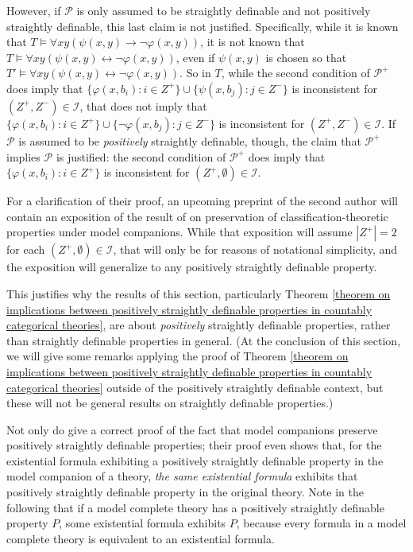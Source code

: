 \documentclass{article}
\newcommand{\vphi}{\varphi}
\theoremstyle{definition}
\theoremstyle{definition}
\theoremstyle{definition}
\begin{document}
{    However, if $\mathcal{P}$ is only assumed to be straightly definable and not positively straightly definable, this last claim is not justified. Specifically, while it is known that $T \models \forall x  y(\psi(x, y) \to \neg\varphi(x, y))$, it is not known that $T \models \forall x y(\psi(x, y) \leftrightarrow \neg\varphi(x, y))$, even if $\psi(x, y)$ is chosen so that $T' \models \forall x y(\psi(x, y) \leftrightarrow \neg\varphi(x, y))$. So in $T$, while the second condition of $\mathcal{P}^{+}$ does imply that $\{\vphi(x,b_i)\colon i\in Z^+\}\cup \{\psi(x,b_j)\colon j\in Z^-\}$ is inconsistent for $(Z^{+}, Z^{-}) \in \mathcal{I}$, that does not imply that $\{\vphi(x,b_i)\colon i\in Z^+\}\cup \{\neg\vphi(x,b_j)\colon j\in Z^-\}$ is inconsistent for $(Z^{+}, Z^{-}) \in \mathcal{I}$. If $\mathcal{P}$ is assumed to be \textit{positively} straightly definable, though, the claim that $\mathcal{P}^{+}$ implies $\mathcal{P}$ is justified: the second condition of $\mathcal{P}^{+}$ does imply that $\{\vphi(x,b_i)\colon i\in Z^+\}$ is inconsistent for $(Z^{+}, \emptyset) \in \mathcal{I}$.
    
    For a clarification of their proof, an upcoming preprint of the second author will contain an exposition of the result of \cite{bodirsky2025taking} on preservation of classification-theoretic properties under model companions. While that exposition will assume $|Z^{+}|=2$ for each $(Z^{+}, \emptyset) \in \mathcal{I}$, that will only be for reasons of notational simplicity, and the exposition will generalize to any positively straightly definable property.}


    This justifies why the results of this section, particularly Theorem \ref{theorem on implications between positively straightly definable properties in countably categorical theories}, are about \textit{positively} straightly definable properties, rather than straightly definable properties in general. (At the conclusion of this section, we will give some remarks applying the proof of Theorem \ref{theorem on implications between positively straightly definable properties in countably categorical theories} outside of the positively straightly definable context, but these will not be general results on straightly definable properties.)


Not only do \cite{bodirsky2025taking} give a correct proof of the fact that model companions preserve positively straightly definable properties; their proof even shows that, for the existential formula exhibiting a positively straightly definable property in the model companion of a theory, \textit{the same existential formula} exhibits that positively straightly definable property in the original theory. Note in the following that if a model complete theory has a positively straightly definable property $P$, some existential formula exhibits $P$, because every formula in a model complete theory is equivalent to an existential formula.
\end{document}
